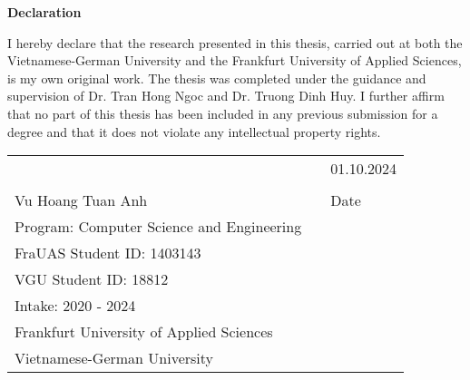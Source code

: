 \centerline{\LARGE \textbf{Declaration}}

\vspace{10mm}

I hereby declare that the research presented in this thesis, carried out at both the Vietnamese-German University and the Frankfurt University of Applied Sciences, is my own original work. The thesis was completed under the guidance and supervision of Dr. Tran Hong Ngoc and Dr. Truong Dinh Huy. I further affirm that no part of this thesis has been included in any previous submission for a degree and that it does not violate any intellectual property rights.

\vfill

\begin{tabular}{@{}p{3.5in}p{0.1in}p{1.5in}@{}}
	& &  \hspace{0.8cm} 01.10.2024 \\
  \hrulefill & & \hrulefill \\
  Vu Hoang Tuan Anh & & Date \\
  Program: Computer Science and Engineering & & \\ 
  FraUAS Student ID: 1403143 & & \\
  VGU Student ID: 18812 & & \\
  Intake: 2020 - 2024 & & \\
  Frankfurt University of Applied Sciences & & \\
  Vietnamese-German University & & \\
\end{tabular}